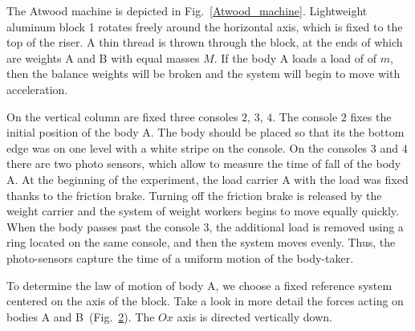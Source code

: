 \documentclass{LabWorkEng}
\begin{document}
\begin{figure}[!htbp]
\begin{subfigure}[b]{0.4\linewidth}
\begin{picbox}
		\end{picbox}
		\label{Forces}
	\end{subfigure}
	\caption{}
\end{figure}


The Atwood machine is depicted in Fig.~\ref{Atwood_machine}. Lightweight aluminum block 1 rotates freely around the horizontal axis, which is fixed to the top of the riser. A thin thread is thrown through the block, at the ends of which are weights A and B with equal masses $M$. If the body A loads a load of of $m$, then the balance weights will be broken and the system will begin to move with acceleration.

On the vertical column are fixed three consoles $2$, $3$, $4$. The console $2$ fixes the initial position of the body A. The body should be placed so that its the bottom edge was on one level with a white stripe on the console. On the consoles $3$ and $4$ there are two photo sensors, which allow to measure the time of fall of the body A.
At the beginning of the experiment, the load carrier A with the load was fixed thanks to the friction brake. Turning off the friction brake is released by the weight carrier and the system of weight workers begins to move equally quickly. When the body passes past the console $3$, the additional load is removed using a ring located on the same console, and then the system moves evenly. Thus, the photo-sensors capture the time of a uniform motion of the body-taker.


To determine the law of motion of body A, we choose a fixed reference system centered on the axis of the block. Take a look in more detail the forces acting on bodies A and B~(Fig.~\ref{Forces}). The $Ox$ axis is directed vertically down.
\end{document}
